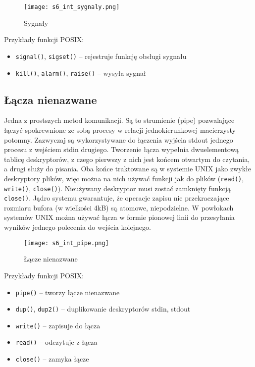 \begin{figure}[!h]
\centering
\texttt{[image: s6\_int\_sygnaly.png]}
\caption{Sygnały}
\end{figure}

Przykłady funkcji POSIX:
\begin{itemize}
	\item \texttt{signal()}, \texttt{sigset()} -- rejestruje funkcję obsługi sygnału
    \item \texttt{kill()}, \texttt{alarm()}, \texttt{raise()} -- wysyła sygnał
\end{itemize}

\subsection{Łącza nienazwane}

Jedna z prostszych metod komunikacji. Są to strumienie (pipe) pozwalające łączyć spokrewnione ze sobą procesy w relacji jednokierunkowej macierzysty -- potomny. Zazwyczaj są wykorzystywane do łączenia wyjścia stdout jednego procesu z wejściem stdin drugiego. Tworzenie łącza wypełnia dwuelementową tablicę deskryptorów, z czego pierwszy z nich jest końcem otwartym do czytania, a drugi służy do pisania. Oba końce traktowane są w systemie UNIX jako zwykłe deskryptory plików, więc można na nich używać funkcji jak do plików (\texttt{read()}, \texttt{write()}, \texttt{close()}). Nieużywany deskryptor musi zostać zamknięty funkcją \texttt{close()}. Jądro systemu gwarantuje, że operacje zapisu nie przekraczające rozmiaru bufora (w wielkości 4kB) są atomowe, niepodzielne. W powłokach systemów UNIX można używać łącza w formie pionowej linii do przesyłania wyników jednego polecenia do wejścia kolejnego.

\newpage

\begin{figure}[!h]
\centering
\texttt{[image: s6\_int\_pipe.png]}
\caption{Łącze nienazwane}
\end{figure}

Przykłady funkcji POSIX:
\begin{itemize}
	\item \texttt{pipe()} -- tworzy łącze nienazwane
    \item \texttt{dup()}, \texttt{dup2()} -- duplikowanie deskryptorów stdin, stdout
    \item \texttt{write()} -- zapisuje do łącza
    \item \texttt{read()} -- odczytuje z łącza
    \item \texttt{close()} -- zamyka łącze
\end{itemize}

